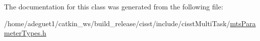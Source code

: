 The documentation for this class was generated from the following file\-:\begin{DoxyCompactItemize}
\item 
/home/adeguet1/catkin\-\_\-ws/build\-\_\-release/cisst/include/cisst\-Multi\-Task/\hyperlink{mts_parameter_types_8h}{mts\-Parameter\-Types.\-h}\end{DoxyCompactItemize}
